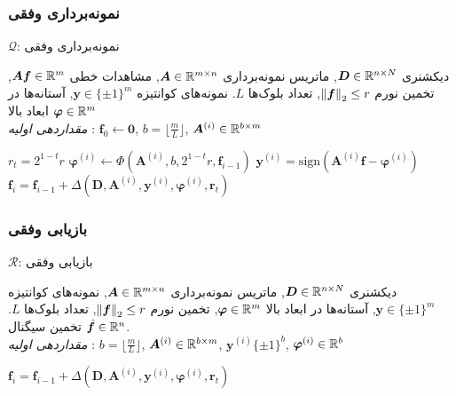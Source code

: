 \begin{frame}
\frametitle{نمونه‌برداری وفقی}
\begin{algorithm}[H]
	\caption{$ \mathcal{Q} $: نمونه‌برداری وفقی}
	\label{alg:AQ}
	\begin{algorithmic}[1]
		\renewcommand{\algorithmicrequire}{\textbf{ورودی:}}
		\renewcommand{\algorithmicensure}{\textbf{خروجی:}}
		\REQUIRE دیکشنری $ \bm{D}\in\mathbb{R}^{n\times N} $, ماتریس نمونه‌برداری $ \bm{A}\in\mathbb{R}^{m\times n} $, مشاهدات خطی $ \bm{Af}\in \mathbb{R}^{m} $, تخمین نورم $ \left\lVert\bm{f}\right\rVert_{2}\leq r $, تعداد بلوک‌ها $ L $.
		\ENSURE  نمونه‌های کوانتیزه $ \bm{y} \in \lbrace\pm 1\rbrace^{m} $, آستانه‌ها در ابعاد بالا $ \bm{\varphi} \in \mathbb{R}^{m} $
		\\ \textit{مقدار‌دهی اولیه} : $ \bm{f}_{0}\leftarrow \bm{0} $, $ b = \lfloor\frac{m}{L}\rfloor $, $ \bm{A}^{(i)}\in \mathbb{R}^{b\times m}  $
		\begin{latin}
		\STATE $r_{t}=2^{1-t}r$
		\STATE $\bm{\varphi}^{\left(i\right)}\leftarrow \Phi(\bm{A}^{(i)},b,2^{1-t}r,\bm{f}_{i-1}) $
		\STATE $ \bm{y}^{\left(i\right)} = \text{sign}\left(\bm{A}^{(i)}\bm{f}-\bm{\varphi}^{\left(i\right)}\right)$
		\STATE $ \bm{f}_{i} = \bm{f}_{i-1} + \varDelta\left(\bm{D},\bm{A}^{(i)},\bm{y}^{\left(i\right)},\bm{\varphi}^{\left(i\right)},\bm{r}_{t}\right) $
		\ENDFOR
		\end{latin}
	\end{algorithmic} 
\end{algorithm}
\end{frame}
\begin{frame}
\frametitle{بازیابی وفقی}
\begin{algorithm}[H]
	\caption{$ \mathcal{R} $: بازیابی وفقی}
	\label{alg:AR}
	\begin{algorithmic}[1]
		\renewcommand{\algorithmicrequire}{\textbf{ورودی:}}
		\renewcommand{\algorithmicensure}{\textbf{خروجی:}}
		\REQUIRE دیکشنری $ \bm{D}\in\mathbb{R}^{n\times N} $, ماتریس نمونه‌برداری $ \bm{A}\in\mathbb{R}^{m\times n} $, نمونه‌های کوانتیزه $ \bm{y} \in \lbrace\pm 1\rbrace^{m} $, آستانه‌ها در ابعاد بالا $ \bm{\varphi}\in\mathbb{R}^{m} $, تخمین نورم $ \left\lVert\bm{f}\right\rVert_{2}\leq r $, تعداد بلوک‌ها $ L $.
		\ENSURE  تخمین سیگنال $ \hat{\bm{f}}\in \mathbb{R}^{n} $.
		\\ \textit{مقداردهی اولیه} :  $ b = \lfloor\frac{m}{L}\rfloor $, $ \bm{A}^{(i)}\in \mathbb{R}^{b\times m}$, $ \bm{y}^{\left(i\right)} \lbrace\pm 1\rbrace^{b}$, $\bm{\varphi}^{\left(i\right)}\in \mathbb{R}^{b} $
		\begin{latin}
		\STATE $ \bm{f}_{i} =\bm{f}_{i-1}+ \varDelta\left(\bm{D},\bm{A}^{(i)},\bm{y}^{\left(i\right)},\bm{\varphi}^{\left(i\right)},\bm{r}_{t}\right) $ 
		\ENDFOR
		\end{latin}
	\end{algorithmic} 
\end{algorithm}
\end{frame}

